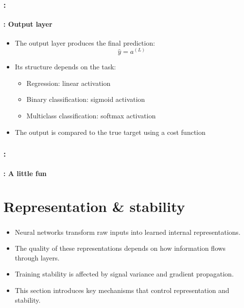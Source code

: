 \documentclass[xcolor=table]{beamer}
\begin{document}
\begin{frame}
	\frametitle{\insertshortsubtitle: \insertsection}
	\framesubtitle{\insertsubsection: Output layer}
	
	\begin{itemize}
		\item The output layer produces the final prediction:
		\[
		\hat{y} = a^{(L)}
		\]
		
		\item Its structure depends on the task:
		\begin{itemize}
			\item Regression: linear activation
			\item Binary classification: sigmoid activation
			\item Multiclass classification: softmax activation
		\end{itemize}
		
		\item The output is compared to the true target using a cost function
	\end{itemize}
	
\end{frame}

\begin{frame}
	\frametitle{\insertshortsubtitle: \insertsection}
	\framesubtitle{\insertsubsection: A little fun}
	
	
\end{frame}

\section{Representation \& stability}

\begin{frame}
	\frametitle{\insertshortsubtitle}
	\framesubtitle{\insertsection}
	
	\begin{itemize}
		\item Neural networks transform raw inputs into learned internal representations.
		\item The quality of these representations depends on how information flows through layers.
		\item Training stability is affected by signal variance and gradient propagation.
		\item This section introduces key mechanisms that control representation and stability.
	\end{itemize}
	
\end{frame}
\end{document}
